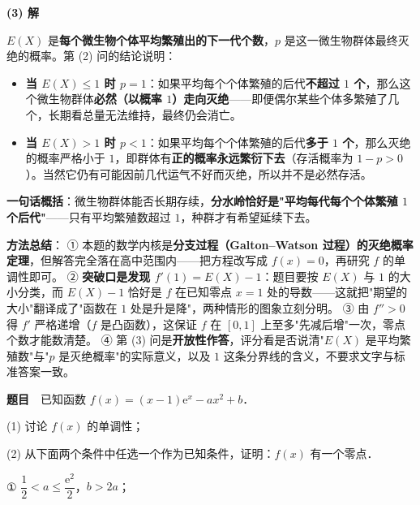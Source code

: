 \textbf{(3) 解}

$E(X)$ 是\textbf{每个微生物个体平均繁殖出的下一代个数}，$p$ 是这一微生物群体最终灭绝的概率。第 (2) 问的结论说明：

\begin{itemize}
\item \textbf{当 $E(X)\le1$ 时 $p=1$}：如果平均每个个体繁殖的后代\textbf{不超过 $1$ 个}，那么这个微生物群体\textbf{必然（以概率 $1$）走向灭绝}——即便偶尔某些个体多繁殖了几个，长期看总量无法维持，最终仍会消亡。
\end{itemize}

\begin{itemize}
\item \textbf{当 $E(X)>1$ 时 $p<1$}：如果平均每个个体繁殖的后代\textbf{多于 $1$ 个}，那么灭绝的概率严格小于 $1$，即群体有\textbf{正的概率永远繁衍下去}（存活概率为 $1-p>0$）。当然它仍有可能因前几代运气不好而灭绝，所以并不是必然存活。
\end{itemize}

\textbf{一句话概括}：微生物群体能否长期存续，\textbf{分水岭恰好是"平均每代每个个体繁殖 $1$ 个后代"}——只有平均繁殖数超过 $1$，种群才有希望延续下去。


\begin{gktip}
\textbf{方法总结}：
① 本题的数学内核是\textbf{分支过程（Galton–Watson 过程）的灭绝概率定理}，但解答完全落在高中范围内——把方程改写成 $f(x)=0$，再研究 $f$ 的单调性即可。
② \textbf{突破口是发现 $f'(1)=E(X)-1$}：题目要按 $E(X)$ 与 $1$ 的大小分类，而 $E(X)-1$ 恰好是 $f$ 在已知零点 $x=1$ 处的导数——这就把"期望的大小"翻译成了"函数在 $1$ 处是升是降"，两种情形的图象立刻分明。
③ 由 $f''>0$ 得 $f'$ 严格递增（$f$ 是凸函数），这保证 $f$ 在 $[0,1]$ 上至多"先减后增"一次，零点个数才能数清楚。
④ 第 (3) 问是\textbf{开放性作答}，评分看是否说清"$E(X)$ 是平均繁殖数"与"$p$ 是灭绝概率"的实际意义，以及 $1$ 这条分界线的含义，不要求文字与标准答案一致。
\end{gktip}

\par\medskip


\textbf{题目}　已知函数 $f(x)=(x-1)\mathrm e^{x}-ax^{2}+b$．

  (1) 讨论 $f(x)$ 的单调性；

  (2) 从下面两个条件中任选一个作为已知条件，证明：$f(x)$ 有一个零点．

  ① $\dfrac12<a\le\dfrac{\mathrm e^{2}}2$，$b>2a$；

